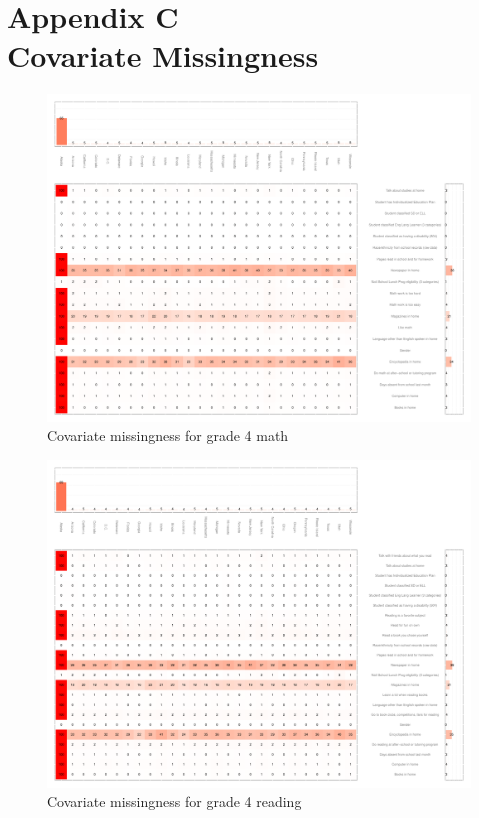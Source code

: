 {}
\section*{Appendix C\\Covariate Missingness}
\label{appendixmissing}

\begin{figure}[h]
\begin{center}
\includegraphics[width=\textwidth]{../Figures2009/g4math-missing.pdf}
\caption{Covariate missingness for grade 4 math}
\label{fig:g4math:missing}
\end{center}
\end{figure}

\begin{figure}[h]
\begin{center}
\includegraphics[width=\textwidth]{../Figures2009/g4read-missing.pdf}
\caption{Covariate missingness for grade 4 reading}
\label{fig:g4reading:missing}
\end{center}
\end{figure}

